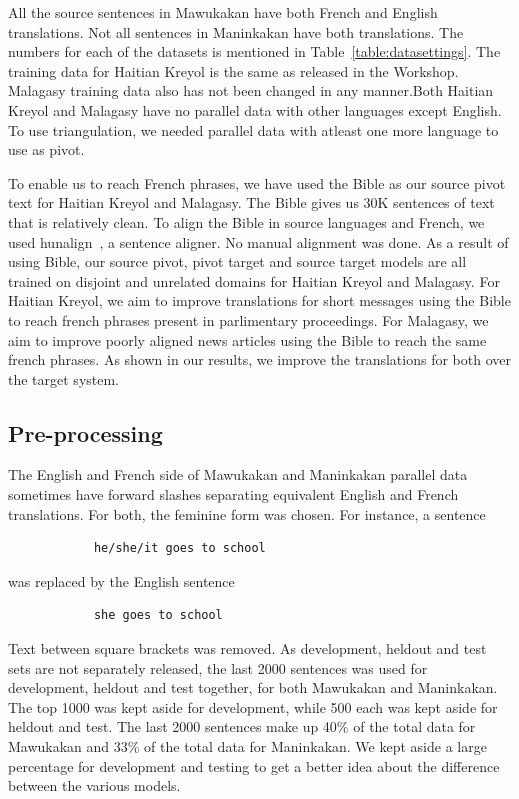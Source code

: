 

All the source sentences in Mawukakan have both French and English translations. Not all sentences in Maninkakan have both translations. The numbers for each of the datasets is mentioned in Table~\ref{table:datasettings}. The training data for Haitian Kreyol is the same as released in the Workshop. Malagasy training data also has not been changed in any manner.Both Haitian Kreyol and Malagasy have no parallel data with other languages except English. To use triangulation, we needed parallel data with atleast one more language to use as pivot. 

To enable us to reach French phrases, we have used the Bible as our source pivot text for Haitian Kreyol and Malagasy. The Bible gives us 30K sentences of text that is relatively clean. To align the Bible in source languages and French, we used hunalign~\cite{Hun:05}, a sentence aligner. No manual alignment was done. As a result of using Bible, our source pivot, pivot target and source target models are all trained on disjoint and unrelated domains for Haitian Kreyol and Malagasy. For Haitian Kreyol, we aim to improve translations for short messages using the Bible to reach french phrases present in parlimentary proceedings. For Malagasy, we aim to improve poorly aligned news articles using the Bible to reach the same french phrases. As shown in our results, we improve the translations for both over the target system. 

\subsection{Pre-processing}

    The English and French side of Mawukakan and Maninkakan parallel data sometimes have forward slashes separating equivalent English and French translations. For both, the feminine form was chosen. For instance, a sentence
    \begin{verbatim}
            he/she/it goes to school
    \end{verbatim}
            was replaced by the English sentence \\
    \begin{verbatim}
            she goes to school
    \end{verbatim}

    Text between square brackets was removed. As development, heldout and test sets are not separately released, the last 2000 sentences was used for development, heldout and test together, for both Mawukakan and Maninkakan. The top 1000 was kept aside for development, while 500 each was kept aside for heldout and test. The last 2000 sentences make up 40\% of the total data for Mawukakan and 33\% of the total data for Maninkakan. We kept aside a large percentage for development and testing to get a better idea about the difference between the various models.

